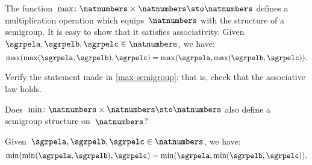 \begin{example}
    \label{max-semigroup}
    The function~$\max \colon \natnumbers \times \natnumbers \sto \natnumbers$ defines a multiplication operation which equips~$\natnumbers$ with the structure of a semigroup.
    It is easy to show that it satisfies associativity. Given~$\sgrpela,\sgrpelb,\sgrpelc\in \natnumbers$, we have:
    \begin{equation*}
        \label{eq:max-assoc}
        \max(\max(\sgrpela,\sgrpelb),\sgrpelc)=\max(\sgrpela,\max(\sgrpelb,\sgrpelc)).
    \end{equation*}
\end{example}

\begin{exercise}
    \label{ex:max-semigroup}
    Verify the statement made in \cref{max-semigroup}; that is, check that the associative law holds.
    
    Does~$\min \colon \natnumbers \times \natnumbers \sto \natnumbers$ also define a semigroup structure on~$\natnumbers$?
\end{exercise}
\begin{solution}
    Given~$\sgrpela,\sgrpelb,\sgrpelc\in \natnumbers$, we have:
    \begin{equation*}
        \label{eq:min-assoc}
        \min(\min(\sgrpela,\sgrpelb),\sgrpelc)=\min(\sgrpela,\min(\sgrpelb,\sgrpelc)).
    \end{equation*}
\end{solution}

